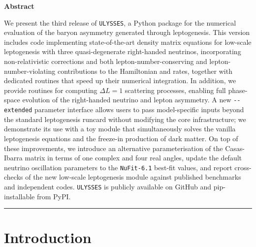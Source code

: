 \documentclass[12pt, a4paper]{article}
\begin{document}
\begin{center}
 {\bf Abstract}
\end{center}
We present the third release of \texttt{ULYSSES}, a Python package for the numerical evaluation of the baryon asymmetry generated through leptogenesis. This version includes code implementing state-of-the-art density matrix equations for low-scale leptogenesis with three quasi-degenerate right-handed neutrinos, incorporating non-relativistic corrections and both lepton-number-conserving and lepton-number-violating contributions to the Hamiltonian and rates, together with dedicated routines that speed up their numerical integration. In addition, we provide routines for computing $\Delta L = 1$ scattering processes, enabling full phase-space evolution of the right-handed neutrino and lepton asymmetry. A new \texttt{-{}-extended} parameter interface allows users to pass model-specific inputs beyond the standard leptogenesis runcard without modifying the core infrastructure; we demonstrate its use with a toy module that simultaneously solves the vanilla leptogenesis equations and the freeze-in production of dark matter. On top of these improvements, we introduce an alternative parameterisation of the Casas-Ibarra matrix in terms of one complex and four real angles, update the default neutrino oscillation parameters to the \texttt{NuFit-6.1} best-fit values, and report cross-checks of the new low-scale leptogenesis module against published benchmarks and independent codes. \texttt{ULYSSES} is publicly available on GitHub \href{https://github.com/earlyuniverse/ulysses}{\faGithub} and pip-installable from PyPI.
\\
\hrule
\vspace{.5em}

\renewcommand*{\thefootnote}{\arabic{footnote}}
\setcounter{footnote}{0}

\tableofcontents

\section{Introduction}
\end{document}
